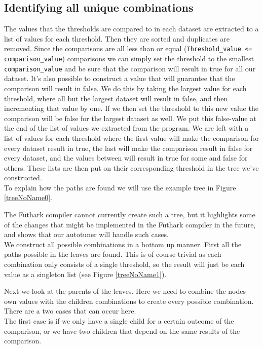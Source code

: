 \subsection{Identifying all unique combinations}
The values that the thresholds are compared to in each dataset are extracted
to a list of values for each threshold. Then they are sorted and duplicates are
removed. Since the comparisons are all less than or equal
(\texttt{Threshold\_value <= comparison\_value}) comparisons we can simply
set the threshold to the smallest \texttt{comparison\_value} and be sure that the comparison
will result in true for all our dataset. It's also possible to construct a
value that will guarantee that the comparison will result in false. We do this
by taking the largest value for each threshold, where all but the largest
dataset will result in false, and then incrementing that value by one. If we
then set the threshold to this new value the comparison will be false for the
largest dataset as well. We put this false-value at
the end of the list of values we extracted from the program. We are left with a
list of values for each threshold where the first value will make the comparison for
every dataset result in true, the last will make the comparison result in false
for every dataset, and the values between will result in true for some and
false for others. These lists are then put on their corresponding threshold in
the tree we've constructed.
\\
To explain how the paths are found we will use the example tree in Figure \ref{treeNoName0}.

The Futhark compiler cannot currently create such a tree, but
it highlights some of the changes that might be implemented in the Futhark
compiler in the future, and shows that our autotuner will handle such cases. \\
We construct all possible combinations in a bottom up manner. First
all the paths possible in the leaves are found. This is of course trivial as
each combination only consists of a single threshold, so the result will just
be each value as a singleton list (see Figure \ref{treeNoName1}).

Next we look at the parents of the leaves. Here we need to combine the nodes
own values with the children combinations to create every possible
combination. There are a two cases that can occur here. \\
The first case is if we only have a single child for a certain outcome of the
comparison, or we have two children that depend on the same results of the comparison. 

